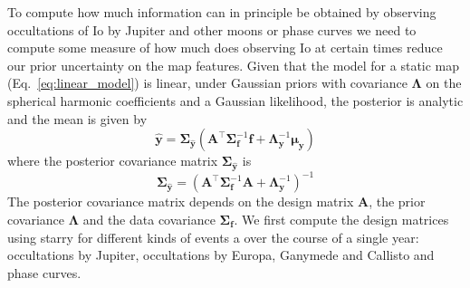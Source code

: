 \documentclass[modern]{aastex62}
\begin{document}
To compute how much information can in principle be obtained by observing occultations of Io by Jupiter and other moons or phase curves we need to compute some measure of how much does observing Io at certain times reduce our prior uncertainty on the map features.
Given that the model for a static map (Eq.~\ref{eq:linear_model}) is linear, under Gaussian priors with covariance $\boldsymbol{\Lambda}$ on the spherical harmonic coefficients and a Gaussian likelihood, the posterior is analytic and the mean is given by
\begin{equation}
    \widehat{\mathbf{y}}=\boldsymbol{\Sigma}_{\hat{\mathbf{y}}}\left(\mathbf{A}^{\top} \boldsymbol{\Sigma}_{\mathbf{f}}^{-1} \mathbf{f}+\boldsymbol{\Lambda}_{\mathbf{y}}^{-1} \boldsymbol{\mu}_{\mathbf{y}}\right)
\end{equation}
where the posterior covariance matrix $\boldsymbol{\Sigma}_{\hat{\mathbf{y}}}$ is 
\begin{equation}
\boldsymbol{\Sigma}_{\hat{\mathbf{y}}}=\left( \mathbf{A}^{\top} \boldsymbol{\Sigma}_{\mathbf{f}}^{-1} \mathbf{A} +\boldsymbol{\Lambda}_{\mathbf{y}}^{-1}\right)^{-1}
\end{equation}
The posterior covariance matrix depends on the design matrix $\mathbf{A}$, the prior covariance  $\boldsymbol{\Lambda}$ and the data covariance $\boldsymbol{\Sigma}_{\mathbf{f}}$.
We first compute the design matrices using \textsf{starry} for different kinds of events a over the course of a single year: occultations by Jupiter, occultations by Europa, Ganymede and Callisto and phase curves.
\end{document}
